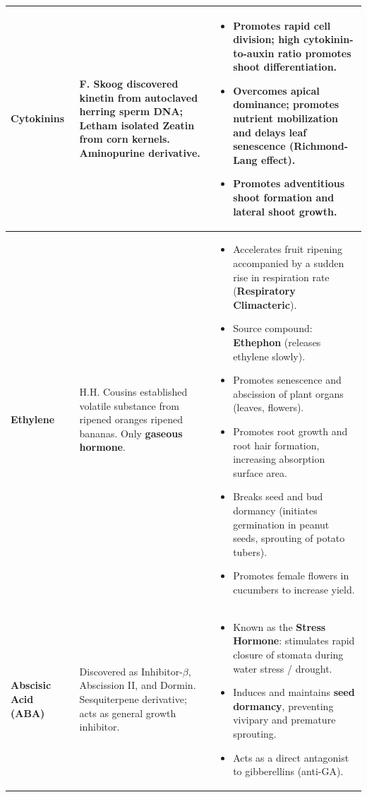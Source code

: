 \documentclass[10pt,a4paper]{article}
\begin{document}
\begin{conceptbox}
\begin{center}
\begin{tabular}{|p{1.8cm}|p{2.6cm}|p{9.4cm}|}
\hline
\textbf{Cytokinins} & F. Skoog discovered kinetin from autoclaved herring sperm DNA; Letham isolated \textbf{Zeatin} from corn kernels. Aminopurine derivative. & \begin{minipage}[t]{9.4cm}\begin{itemize}[leftmargin=*,nosep] \item Promotes rapid cell division; high cytokinin-to-auxin ratio promotes shoot differentiation. \item Overcomes apical dominance; promotes nutrient mobilization and delays leaf senescence (\textbf{Richmond-Lang effect}). \item Promotes adventitious shoot formation and lateral shoot growth. \end{itemize}\end{minipage} \\
\hline
\textbf{Ethylene} & H.H. Cousins established volatile substance from ripened oranges ripened bananas. Only \textbf{gaseous hormone}. & \begin{minipage}[t]{9.4cm}\begin{itemize}[leftmargin=*,nosep] \item Accelerates fruit ripening accompanied by a sudden rise in respiration rate (\textbf{Respiratory Climacteric}). \item Source compound: \textbf{Ethephon} (releases ethylene slowly). \item Promotes senescence and abscission of plant organs (leaves, flowers). \item Promotes root growth and root hair formation, increasing absorption surface area. \item Breaks seed and bud dormancy (initiates germination in peanut seeds, sprouting of potato tubers). \item Promotes female flowers in cucumbers to increase yield. \end{itemize}\end{minipage} \\
\hline
\textbf{Abscisic Acid (ABA)} & Discovered as Inhibitor-$\beta$, Abscission II, and Dormin. Sesquiterpene derivative; acts as general growth inhibitor. & \begin{minipage}[t]{9.4cm}\begin{itemize}[leftmargin=*,nosep] \item Known as the \textbf{Stress Hormone}: stimulates rapid closure of stomata during water stress / drought. \item Induces and maintains \textbf{seed dormancy}, preventing vivipary and premature sprouting. \item Acts as a direct antagonist to gibberellins (anti-GA). \end{itemize}\end{minipage} \\
\hline
\end{tabular}
\end{center}
\end{conceptbox}
\end{document}
